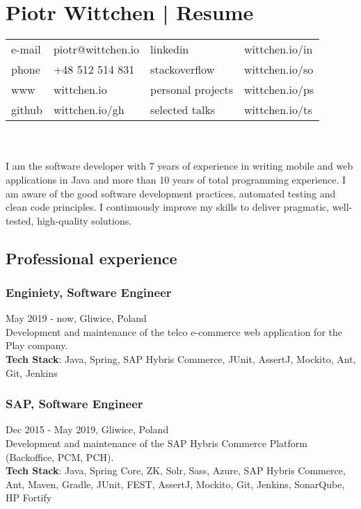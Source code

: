 \documentclass{article}
\begin{document}
  \section*{Piotr Wittchen | Resume}

  \begin{tabular}{llll}
    e-mail & piotr@wittchen.io & linkedin          & wittchen.io/in \\
    phone  & +48 512 514 831   & stackoverflow     & wittchen.io/so \\
    www    & wittchen.io       & personal projects & wittchen.io/ps \\
    github & wittchen.io/gh    & selected talks    & wittchen.io/ts \\
  \end{tabular} \\ \\

    I am the software developer with 7 years of experience in writing mobile and web applications in Java and more than 10 years of total programming experience. I am aware of the good software development practices, automated testing and clean code principles. I continuously improve my skills to deliver pragmatic, well-tested, high-quality solutions.

    \subsection*{Professional experience}

      \subsubsection*{Enginiety, Software Engineer}
      May 2019 - now, Gliwice, Poland\\[0.3em] 
      Development and maintenance of the telco e-commerce web application for the Play company.\\
      \textbf{Tech Stack}: Java, Spring, SAP Hybris Commerce, JUnit, AssertJ, Mockito, Ant, Git, Jenkins

      \subsubsection*{SAP, Software Engineer} 
      Dec 2015 - May 2019, Gliwice, Poland\\[0.3em]
      Development and maintenance of the SAP Hybris Commerce Platform (Backoffice, PCM, PCH).\\
      \textbf{Tech Stack}: Java, Spring Core, ZK, Solr, Sass, Azure,
      SAP Hybris Commerce, Ant, Maven, Gradle, JUnit, FEST, AssertJ, 
      Mockito, Git, Jenkins, SonarQube, HP Fortify
\end{document}

